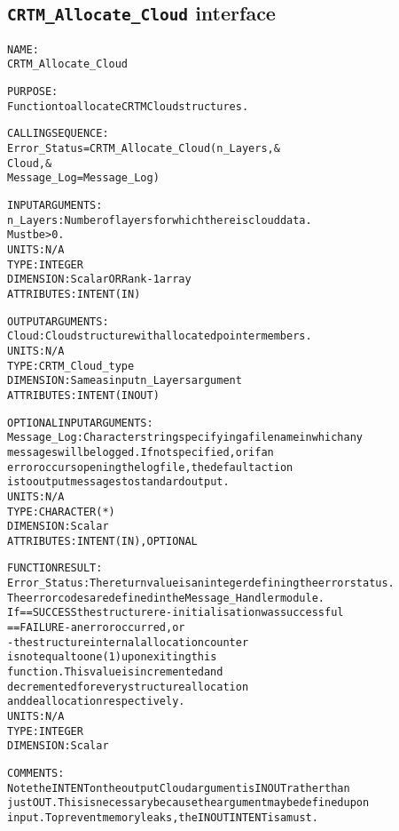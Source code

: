 \subsection{\texttt{CRTM\_Allocate\_Cloud} interface}
  \label{sec:CRTM_Allocate_Cloud_interface}
  \begin{alltt}
 
  NAME:
        CRTM_Allocate_Cloud
  
  PURPOSE:
        Function to allocate CRTM Cloud structures.
 
  CALLING SEQUENCE:
        Error_Status = CRTM_Allocate_Cloud( n_Layers               , &
                                            Cloud                  , &
                                            Message_Log=Message_Log  )
 
  INPUT ARGUMENTS:
        n_Layers:     Number of layers for which there is cloud data.
                      Must be > 0.
                      UNITS:      N/A
                      TYPE:       INTEGER
                      DIMENSION:  Scalar OR Rank-1 array
                      ATTRIBUTES: INTENT(IN)
 
  OUTPUT ARGUMENTS:
        Cloud:        Cloud structure with allocated pointer members.
                      UNITS:      N/A
                      TYPE:       CRTM_Cloud_type
                      DIMENSION:  Same as input n_Layers argument
                      ATTRIBUTES: INTENT(IN OUT)
 
  OPTIONAL INPUT ARGUMENTS:
        Message_Log:  Character string specifying a filename in which any
                      messages will be logged. If not specified, or if an
                      error occurs opening the log file, the default action
                      is to output messages to standard output.
                      UNITS:      N/A
                      TYPE:       CHARACTER(*)
                      DIMENSION:  Scalar
                      ATTRIBUTES: INTENT(IN), OPTIONAL
 
  FUNCTION RESULT:
        Error_Status: The return value is an integer defining the error status.
                      The error codes are defined in the Message_Handler module.
                      If == SUCCESS the structure re-initialisation was successful
                         == FAILURE - an error occurred, or
                                    - the structure internal allocation counter
                                      is not equal to one (1) upon exiting this
                                      function. This value is incremented and
                                      decremented for every structure allocation
                                      and deallocation respectively.
                      UNITS:      N/A
                      TYPE:       INTEGER
                      DIMENSION:  Scalar
 
  COMMENTS:
        Note the INTENT on the output Cloud argument is IN OUT rather than
        just OUT. This is necessary because the argument may be defined upon
        input. To prevent memory leaks, the IN OUT INTENT is a must.
 
  \end{alltt}
